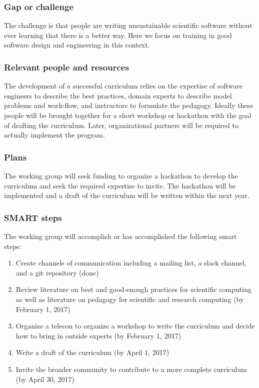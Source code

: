 \subsubsection{Gap or challenge}

The challenge is that people are writing unsustainable scientific
software without ever learning that there is a better way. Here we
focus on training in good software design and engineering in this
context.

\subsubsection{Relevant people and resources}

The development of a successful curriculum relies on the expertise of
software engineers to describe the best practices, domain experts to
describe model problems and work-flow, and instructors to formulate
the pedagogy. Ideally these people will be brought together for a
short workshop or hackathon with the goal of drafting the
curriculum. Later, organizational partners will be required to
actually implement the program.

\subsubsection{Plans}

The working group will seek funding to organize a hackathon to develop
the curriculum and seek the required expertise to invite. The
hackathon will be implemented and a draft of the curriculum will be
written within the next year.

\subsubsection{SMART steps}

The working group will accomplish or has accomplished the following
smart steps:

\begin{enumerate}
\item Create channels of communication including a mailing list, a
  slack channel, and a git repository (done)
\item Review literature on best and good-enough practices for
  scientific computing as well as literature on pedagogy for
  scientific and research computing (by February 1, 2017)
\item Organize a telecon to organize a workshop to write the
  curriculum and decide how to bring in outside experts (by February 1,
  2017)
\item Write a draft of the curriculum (by April 1, 2017)
\item Invite the broader community to contribute to a more complete
  curriculum (by April 30, 2017)
\end{enumerate}

